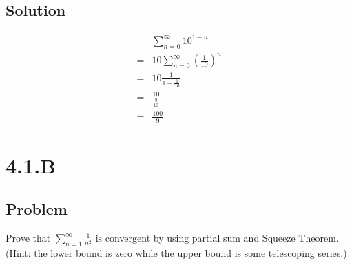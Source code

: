 \documentclass[12pt]{article}
\newcommand{\round}[1]{\left(       #1 \right)      }
\begin{document}
\subsection*{Solution}
\begin{align*}
     & \sum_{n=0}^\infty 10^{1-n} \\
    =& 10 \sum_{n=0}^\infty \round{\frac{1}{10}}^n \\
    =& 10 \frac{1}{1 - \frac{1}{10}} \\
    =& \frac{10}{\frac{9}{10}} \\
    =& \frac{100}{9}
\end{align*}



\section*{4.1.B}

\subsection*{Problem}
Prove that $\sum_{n=1}^\infty \frac{1}{n^2}$ is convergent by using partial sum and Squeeze Theorem. (Hint: the lower bound is zero while the upper bound is some telescoping series.)
\end{document}
